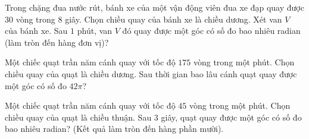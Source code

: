 \begin{ex}%
	Trong chặng đua nước rút, bánh xe của một vận động viên đua  xe đạp quay được $30$ vòng trong $8$ giây. Chọn chiều quay của bánh xe là chiều dương. Xét van $V$ của bánh xe.
	Sau $1$ phút, van $V$ đó quay được  một góc có số đo bao nhiêu radian (làm tròn đến hàng đơn vị)?
\end{ex}

\begin{ex}%
	Một chiếc quạt trần năm cánh quay với tốc độ $175$ vòng trong một phút. Chọn chiều quay của quạt là chiều dương. Sau thời gian bao lâu cánh quạt quay được một góc có số đo $42\pi$? 
\end{ex}

\begin{ex}%
	Một chiếc quạt trần năm cánh quay với tốc độ $45$ vòng trong một phút. Chọn chiều quay của quạt là chiều thuận. Sau $3$ giây, quạt quay được một góc có  số đo bao nhiêu radian? (Kết quả làm tròn đến hàng phần mười).
\end{ex}

